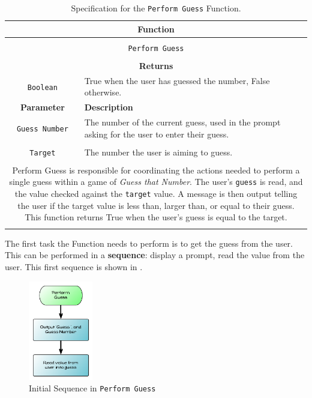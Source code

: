 \begin{table}[h]
  \centering
  \begin{tabular}{|c|p{9cm}|}
    \hline
    \multicolumn{2}{|c|}{\textbf{Function}} \\
    \hline
    \multicolumn{2}{|c|}{} \\
    \multicolumn{2}{|c|}{\texttt{Perform Guess}} \\
    \multicolumn{2}{|c|}{} \\
    \hline
    \multicolumn{2}{|c|}{\textbf{Returns}} \\
    \hline
    \texttt{Boolean} & True when the user has guessed the number, False otherwise. \\
    \hline
    \textbf{Parameter} & \textbf{Description} \\
    \hline
    \texttt{Guess Number} & The number of the current guess, used in the prompt asking for the user to enter their guess. \\
    & \\
    \texttt{Target}   & The number the user is aiming to guess. \\
    \hline
    \multicolumn{2}{|c|}{} \\
    \multicolumn{2}{|p{12cm}|}{Perform Guess is responsible for coordinating the actions needed to perform a single guess within a game of \emph{Guess that Number}. The user's \texttt{guess} is read, and the value checked against the \texttt{target} value. A message is then output telling the user if the target value is less than, larger than, or equal to their guess. This function returns True when the user's guess is equal to the target.} \\
    \multicolumn{2}{|c|}{} \\
    \hline
  \end{tabular}
  \caption{Specification for the \texttt{Perform Guess} Function.}
  \label{tbl:perform guess}
\end{table}

The first task the Function needs to perform is to get the guess from the user. This can be performed in a \textbf{sequence}: display a prompt, read the value from the user. This first sequence is shown in .

\begin{figure}[h]
   \centering
   \includegraphics[width=0.25\textwidth]{./topics/control-flow/diagrams/PerformGuess1} 
   \caption{Initial Sequence in \texttt{Perform Guess}}
   \label{fig:perform-guess-seq-1}
\end{figure}

